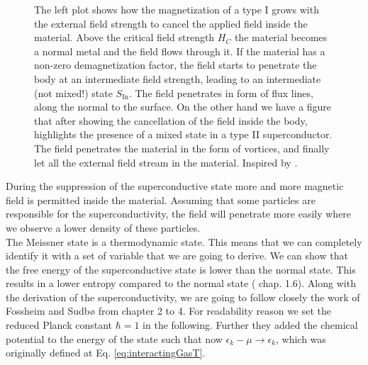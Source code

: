 \documentclass[../main.tex]{subfile}
\begin{document}
\begin{figure}[H]
        
            \caption{The left plot shows how the magnetization of a type I grows with the external field strength to cancel the applied field inside the material. Above
            the critical field strength $H_C$ the material becomes a normal metal and the field flows through it. If the material has a non-zero demagnetization factor,
            the field starts to penetrate the body at an intermediate field strength, leading to an intermediate (not mixed!) state $S_{\text{In}}$.
             The field penetrates in form of
            flux lines, along the normal to the surface. On the other hand we have a figure
            that after showing the cancellation of the field inside the body, highlights the presence of a mixed state in a type II superconductor. The field penetrates 
            the material in the form of vortices, and finally let all the external field stream in the material.
            Inspired by \cite{FossheimSudbo2004}.}
        \end{figure}
During the suppression of the superconductive state more and more magnetic field 
is permitted inside the material. Assuming that some particles are responsible for the superconductivity, the field will penetrate more easily where we observe
a lower density of these particles.\\

The Meissner state is a thermodynamic state. This means that we can completely identify it with a set of variable that we are going to derive.
We can show that the free energy of the superconductive state is lower than the normal state. 
This results in a lower entropy compared to the normal state (\cite{FossheimSudbo2004} chap. 1.6).
Along with the derivation of the superconductivity, we are going to follow closely the work of Fossheim and Sudbø \cite{FossheimSudbo2004} from chapter 2 to 4.
For readability reason we set the reduced Planck constant $\hbar = 1$ in the following. Further they added the chemical potential to the energy of the state such
that now $\epsilon_k - \mu \rightarrow \epsilon_k $, which was originally defined at Eq. \ref{eq:interactingGasT}.\\
\end{document}
